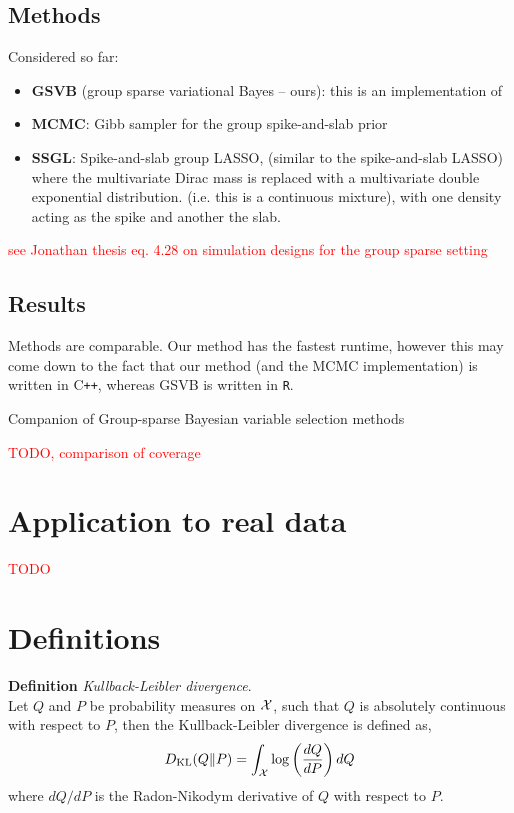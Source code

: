 \documentclass[12pt]{article}
\renewcommand{\red}[1]{\textcolor{red}{#1}}
\begin{document}
\subsection{Methods}

Considered so far:
\begin{itemize}
    \item \textbf{GSVB} (group sparse variational Bayes -- ours): this is an implementation of
    \item \textbf{MCMC}: Gibb sampler for the group spike-and-slab prior
    \item \textbf{SSGL}: Spike-and-slab group LASSO, (similar to the spike-and-slab LASSO) where the multivariate Dirac mass is replaced with a multivariate double exponential distribution. (i.e. this is a continuous mixture), with one density acting as the spike and another the slab.
\end{itemize}

\red{see Jonathan thesis eq. 4.28 on simulation designs for the group sparse setting}

\subsection{Results}

Methods are comparable. Our method has the fastest runtime, however this may come down to the fact that our method (and the MCMC implementation) is written in C\texttt{++}, whereas GSVB is written in \texttt{R}.

\begin{table}[htp]
    \centering
    
    \caption{Companion of Group-sparse Bayesian variable selection methods}
    \label{tab:bvs_comprison}
\end{table}


\red{TODO, comparison of coverage}


\newpage




\newpage
\section{Application to real data}

\red{TODO}


\newpage


\appendix
{}


\section{Definitions}
\textbf{Definition} \textit{Kullback-Leibler divergence}.\\ Let $Q$ and $P$ be probability measures on $\mathcal{X}$, such that $ Q $ is absolutely continuous with respect to $P$, then the Kullback-Leibler divergence is defined as,
\begin{equation}\label{eq:kl}
D_\text{KL}(Q \| P) = \int_{\mathcal{X}} \log \left( \frac{dQ}{dP} \right) dQ
\end{equation}
where $dQ/dP$ is the Radon-Nikodym derivative of $Q$ with respect to $P$.
\end{document}
